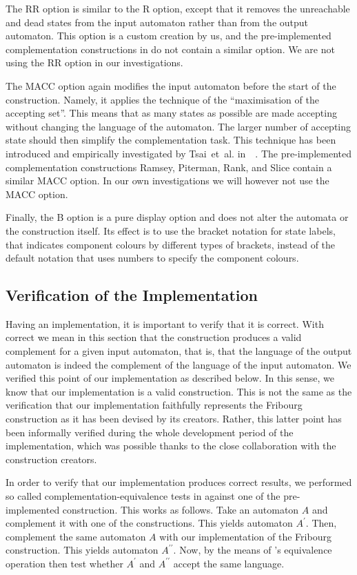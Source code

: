 The RR option is similar to the R option, except that it removes the unreachable and dead states from the input automaton rather than from the output automaton. This option is a custom creation by us, and the pre-implemented complementation constructions in \goal{} do not contain a similar option. We are not using the RR option in our investigations.

The MACC option again modifies the input automaton before the start of the construction. Namely, it applies the technique of the ``maximisation of the accepting set''. This means that as many states as possible are made accepting without changing the language of the automaton. The larger number of accepting state should then simplify the complementation task. This technique has been introduced and empirically investigated by Tsai~et~al. in~~\cite{2011_tsai}. The pre-implemented complementation constructions Ramsey, Piterman, Rank, and Slice contain a similar MACC option. In our own investigations we will however not use the MACC option.

Finally, the B option is a pure display option and does not alter the automata or the construction itself. Its effect is to use the bracket notation for state labels, that indicates component colours by different types of brackets, instead of the default notation that uses numbers to specify the component colours.


\subsection{Verification of the Implementation}
\label{4_verification}
Having an implementation, it is important to verify that it is correct. With correct we mean in this section that the construction produces a valid complement for a given input automaton, that is, that the language of the output automaton is indeed the complement of the language of the input automaton. We verified this point of our implementation as described below. In this sense, we know that our implementation is a valid construction. This is not the same as the verification that our implementation faithfully represents the Fribourg construction as it has been devised by its creators. Rather, this latter point has been informally verified during the whole development period of the implementation, which was possible thanks to the close collaboration with the construction creators.

In order to verify that our implementation produces correct results, we performed so called complementation-equivalence tests in \goal{} against one of the pre-implemented construction. This works as follows. Take an automaton $A$ and complement it with one of the \goal{} constructions. This yields automaton $A^\prime$. Then, complement the same automaton $A$ with our implementation of the Fribourg construction. This yields automaton $A^{\prime\prime}$. Now, by the means of \goal's equivalence operation then test whether $A^\prime$ and $A^{\prime\prime}$ accept the same language.


